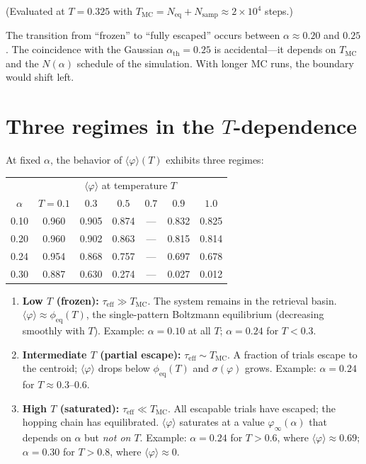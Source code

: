 \documentclass[11pt]{article}
\begin{document}
(Evaluated at $T = 0.325$ with $T_{\mathrm{MC}} = N_{\mathrm{eq}} + N_{\mathrm{samp}} \approx 2 \times 10^4$ steps.)

The transition from ``frozen'' to ``fully escaped'' occurs between $\alpha \approx 0.20$ and $0.25$.  The coincidence with the Gaussian $\alpha_{\mathrm{th}} = 0.25$ is accidental---it depends on $T_{\mathrm{MC}}$ and the $N(\alpha)$ schedule of the simulation.  With longer MC runs, the boundary would shift left.

\section{Three regimes in the $T$-dependence}

At fixed $\alpha$, the behavior of $\langle\varphi\rangle(T)$ exhibits three regimes:

\begin{center}
\begin{tabular}{ccccccc}
\toprule
 & \multicolumn{6}{c}{$\langle\varphi\rangle$ at temperature $T$} \\
$\alpha$ & $T=0.1$ & $0.3$ & $0.5$ & $0.7$ & $0.9$ & $1.0$ \\
\midrule
0.10 & 0.960 & 0.905 & 0.874 & --- & 0.832 & 0.825 \\
0.20 & 0.960 & 0.902 & 0.863 & --- & 0.815 & 0.814 \\
0.24 & 0.954 & 0.868 & 0.757 & --- & 0.697 & 0.678 \\
0.30 & 0.887 & 0.630 & 0.274 & --- & 0.027 & 0.012 \\
\bottomrule
\end{tabular}
\end{center}

\begin{enumerate}
\item \textbf{Low $T$ (frozen):}  $\tau_{\mathrm{eff}} \gg T_{\mathrm{MC}}$.  The system remains in the retrieval basin.  $\langle\varphi\rangle \approx \phi_{\mathrm{eq}}(T)$, the single-pattern Boltzmann equilibrium (decreasing smoothly with $T$).  Example: $\alpha = 0.10$ at all $T$; $\alpha = 0.24$ for $T < 0.3$.

\item \textbf{Intermediate $T$ (partial escape):}  $\tau_{\mathrm{eff}} \sim T_{\mathrm{MC}}$.  A fraction of trials escape to the centroid; $\langle\varphi\rangle$ drops below $\phi_{\mathrm{eq}}(T)$ and $\sigma(\varphi)$ grows.  Example: $\alpha = 0.24$ for $T \approx 0.3$--$0.6$.

\item \textbf{High $T$ (saturated):}  $\tau_{\mathrm{eff}} \ll T_{\mathrm{MC}}$.  All escapable trials have escaped; the hopping chain has equilibrated.  $\langle\varphi\rangle$ saturates at a value $\varphi_\infty(\alpha)$ that depends on $\alpha$ but \emph{not on $T$}.  Example: $\alpha = 0.24$ for $T > 0.6$, where $\langle\varphi\rangle \approx 0.69$; $\alpha = 0.30$ for $T > 0.8$, where $\langle\varphi\rangle \approx 0$.
\end{enumerate}
\end{document}
